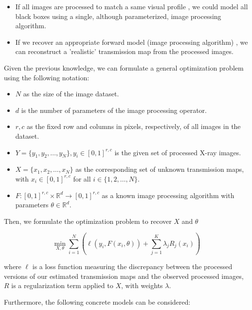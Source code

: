 \documentclass[nomenclature, english, bibtex]{kththesis}
\numberwithin{listing}{chapter}
\begin{document}
\begin{itemize}
    \item If all images are processed to match a same visual profile , we could model all black boxes using a single,
        although parameterized, image processing algorithm.
    \item If we recover an appropriate forward model (image processing algorithm) , we can reconstruct a
        'realistic' transmission map from the processed images.
\end{itemize}

Given the previous knowledge, we can formulate a general optimization problem using the following notation:

\begin{itemize}
    \item $N$ as the size of the image dataset.
    \item $d$ is the number of parameters of the image processing operator.
    \item $r, c$ as the fixed row and columns in pixels, respectively, of all images in the dataset.
    \item $Y = \{ y_1, y_2, \dots, y_N \}, y_i \in [0, 1]^{r, c}$ is the given set of processed X-ray images.
    \item $X=\{x_{1}, x_{2}, \dots, x_{N}\} $ as the corresponding set of unknown transmission maps, with $x_i \in [0,1]^{r,c}$ for all $i \in \{1,2,\dots,N\}$. 
    \item $F:[0,1]^{r, c} \times \mathbb{R}^d \to [0, 1]^{r, c}$  as a known image processing algorithm with parameters $\theta \in \mathbb{R}^d$.
\end{itemize}

Then, we formulate the optimization problem to recover $X$ and $\theta$

\begin{equation}
    \min_{X, \theta} \sum_{i=1}^{N} \left( \ell(y_i, F(x_i, \theta)) + \sum_{j = 1}^{K} \lambda_j R_j(x_i) \right)
\end{equation}

where $\ell$ is a loss function measuring the discrepancy between the processed versions of our estimated transmission
maps and the observed processed images, $R$ is a regularization term applied to $X$, with weights $\lambda$.

Furthermore, the following concrete models can be considered:
\end{document}

